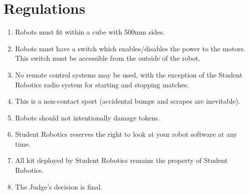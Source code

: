 \section {Regulations}
\label{regs}

\begin{enumerate}
\item Robots must fit within a cube with 500mm sides.
\item Robots must have a switch which enables/disables the power to the motors.  This switch must be accessible from the outside of the robot.
\item No remote control systems may be used, with the exception of the Student Robotics radio system for starting and stopping matches.
\item This is a non-contact sport (accidental bumps and scrapes are inevitable).
\item Robots should not intentionally damage tokens.
\item Student Robotics reserves the right to look at your robot software at any time.
\item All kit deployed by Student Robotics remains the property of Student Robotics.
\item The Judge's decision is final.
\end{enumerate}
